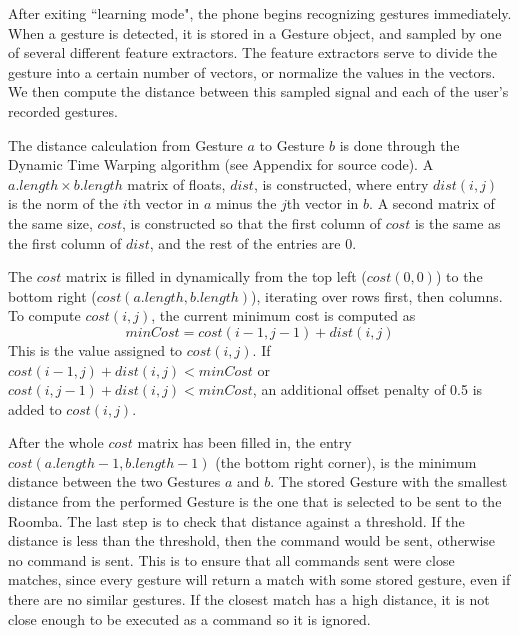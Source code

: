 \documentclass[12pt, letterpaper]{report}
\begin{document}
After exiting ``learning mode", the phone begins recognizing gestures immediately. When a gesture is detected, it is stored in a Gesture object, and sampled by one of several different feature extractors. The feature extractors serve to divide the gesture into a certain number of vectors, or normalize the values in the vectors. We then compute the distance between this sampled signal and each of the user's recorded gestures.

The distance calculation from Gesture $a$ to Gesture $b$ is done through the Dynamic Time Warping algorithm (see Appendix for source code). A $a.length \times b.length$ matrix of floats, $dist$, is constructed, where entry $dist(i,j)$ is the norm of the $i$th vector in $a$ minus the $j$th vector in $b$. A second matrix of the same size, $cost$, is constructed so that the first column of $cost$ is the same as the first column of $dist$, and the rest of the entries are 0.

The $cost$ matrix is filled in dynamically from the top left ($cost(0, 0)$) to the bottom right ($cost(a.length, b.length)$), iterating over rows first, then columns. To compute $cost(i, j)$, the current minimum cost is computed as \[minCost = cost(i - 1, j - 1) + dist(i, j)\] This is the value assigned to $cost(i, j)$. If $cost(i - 1, j) + dist(i, j) < minCost$ or $cost(i, j - 1) + dist(i, j) < minCost$, an additional offset penalty of 0.5 is added to $cost(i, j)$.

After the whole $cost$ matrix has been filled in, the entry $cost(a.length - 1, b.length - 1)$ (the bottom right corner), is the minimum distance between the two Gestures $a$ and $b$. The stored Gesture with the smallest distance from the performed Gesture is the one that is selected to be sent to the Roomba. The last step is to check that distance against a threshold. If the distance is less than the threshold, then the command would be sent, otherwise no command is sent. This is to ensure that all commands sent were close matches, since every gesture will return a match with some stored gesture, even if there are no similar gestures. If the closest match has a high distance, it is not close enough to be executed as a command so it is ignored.
\end{document}
